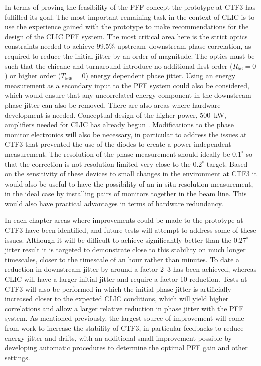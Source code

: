 In terms of proving the feasibility of the PFF concept the prototype at CTF3 has fulfilled its goal.  The most important remaining task in the context of CLIC is to use the experience gained with the prototype to make recommendations for the design of the CLIC PFF system. The most critical area here is the strict optics constraints needed to achieve 99.5\% upstream--downstream phase correlation, as required to reduce the initial jitter by an order of magnitude. The optics must be such that the chicane and turnaround introduce no additional first order (\(R_{56} = 0\)) or higher order (\(T_{566} = 0\)) energy dependent phase jitter. Using an energy measurement as a secondary input to the PFF system could also be considered, which would ensure that any uncorrelated energy component in the downstream phase jitter can also be removed. There are also areas where hardware development is needed. Conceptual design of the higher power, 500~kW, amplifiers needed for CLIC has already begun \cite{colinCLIC16}. Modifications to the phase monitor electronics will also be necessary, in particular to address the issues at CTF3 that prevented the use of the diodes to create a power independent measurement. The resolution of the phase measurement should ideally be \(0.1^\circ\) so that the correction is not resolution limited very close to the \(0.2^\circ\) target. Based on the sensitivity of these devices to small changes in the environment at CTF3 it would also be useful to have the possibility of an in-situ resolution measurement, in the ideal case by installing pairs of monitors together in the beam line. This would also have practical advantages in terms of hardware redundancy.

In each chapter areas where improvements could be made to the prototype at CTF3 have been identified, and future tests will attempt to address some of these issues. Although it will be difficult to achieve significantly better than the \(0.27^\circ\) jitter result it is targeted to demonstrate close to this stability on much longer timescales, closer to the timescale of an hour rather than minutes. To date a reduction in downstream jitter by around a factor 2--3 has been achieved, whereas CLIC will have a larger initial jitter and require a factor 10 reduction. Tests at CTF3 will also be performed in which the initial phase jitter is artificially increased closer to the expected CLIC conditions, which will yield higher correlations and allow a larger relative reduction in phase jitter with the PFF system. As mentioned previously, the largest source of improvement will come from work to increase the stability of CTF3, in particular feedbacks to reduce energy jitter and drifts, with an additional small improvement possible by developing automatic procedures to determine the optimal PFF gain and other settings.


